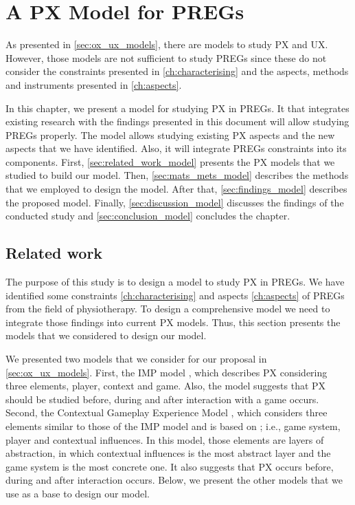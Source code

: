 \chapter{A PX Model for \acp{PREG}}
\label{ch:model}
As presented in \autoref{sec:ox_ux_models}, there are models to study \ac{PX} and \ac{UX}. However, those models are not sufficient to study \acp{PREG} since these do not consider the constraints presented in \autoref{ch:characterising} and the aspects, methods and instruments presented in \autoref{ch:aspects}.

In this chapter, we present a model for studying \ac{PX} in \acp{PREG}. It that integrates existing research with the findings presented in this document will allow studying \acp{PREG} properly. The model allows studying existing \ac{PX} aspects and the new aspects that we have identified. Also, it will integrate \acp{PREG} constraints into its components. First, \autoref{sec:related_work_model} presents the \ac{PX} models that we studied to build our model. Then, \autoref{sec:mats_mets_model} describes the methods that we employed to design the model. After that, \autoref{sec:findings_model} describes the proposed model. Finally, \autoref{sec:discussion_model} discusses the findings of the conducted study and \autoref{sec:conclusion_model} concludes the chapter.

\section{Related work} %
\label{sec:related_work_model}
The purpose of this study is to design a model to study \ac{PX} in \acp{PREG}. We have identified some constraints \autoref{ch:characterising} and aspects \autoref{ch:aspects} of \acp{PREG} from the field of physiotherapy. To design a comprehensive model we need to integrate those findings into current \ac{PX} models. Thus, this section presents the models that we considered to design our model.

We presented two models that we consider for our proposal in \autoref{sec:ox_ux_models}. First, the \ac{IMP} model \autocite{Elson2014}, which describes \ac{PX} considering three elements, player, context and game. Also, the model suggests that \ac{PX} should be studied before, during and after interaction with a game occurs. Second, the Contextual Gameplay Experience Model \autocite{Engl2013}, which considers three elements similar to those of the \ac{IMP} model and is based on \autocite{Nackea2,Nacked}; i.e., game system, player and contextual influences. In this model, those elements are layers of abstraction, in which contextual influences is the most abstract layer and the game system is the most concrete one. It also suggests that \ac{PX} occurs before, during and after interaction occurs. Below, we present the other models that we use as a base to design our model.

